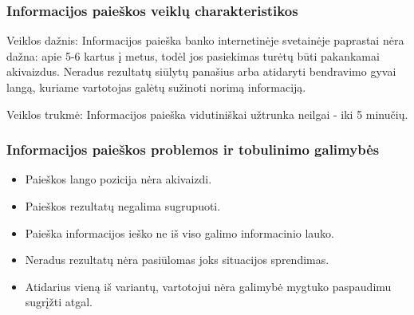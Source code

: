 \documentclass{VUMIFPSkursinis}
\begin{document}
\subsubsection{Informacijos paieškos veiklų charakteristikos}
Veiklos dažnis: Informacijos paieška banko internetinėje svetainėje paprastai nėra dažna: apie 5-6 kartus į metus, todėl jos pasiekimas turėtų būti pakankamai akivaizdus. Neradus rezultatų siūlytų panašius arba atidaryti bendravimo gyvai langą, kuriame vartotojas galėtų sužinoti norimą informaciją. \par
Veiklos trukmė: Informacijos paieška vidutiniškai užtrunka neilgai - iki 5 minučių.
\subsubsection{Informacijos paieškos problemos ir tobulinimo galimybės}
\begin{itemize}
	\item Paieškos lango pozicija nėra akivaizdi.
	\item Paieškos rezultatų negalima sugrupuoti.
	\item Paieška informacijos ieško ne iš viso galimo informacinio lauko.
	\item Neradus rezultatų nėra pasiūlomas joks situacijos sprendimas.
	\item Atidarius vieną iš variantų, vartotojui nėra galimybė mygtuko paspaudimu sugrįžti atgal.
\end{itemize}
\end{document}
